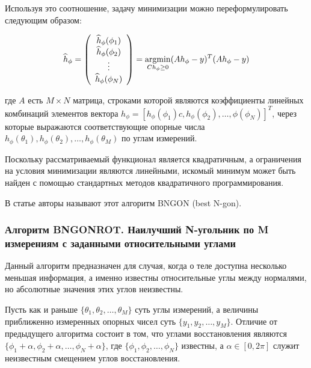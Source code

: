 \documentclass[a4paper, 12pt, titlepage]{article}
\theoremstyle{definition}
\theoremstyle{plain}
\begin{document}
Используя это соотношение, задачу минимизации можно переформулировать следующим
образом:

\begin{equation}
\widehat{h}_{\phi} = \left(
\begin{array}{c}
 \widehat{h}_{\phi}(\phi_{1}) \\
 \widehat{h}_{\phi}(\phi_{2}) \\
 \vdots \\
 \widehat{h}_{\phi}(\phi_{N}) \\
\end{array}
\right) = \operatornamewithlimits{argmin}_{C h_{\phi} \geq 0} (A h_{\phi} -
y)^{T} (A h_{\phi} - y)
\end{equation}

где $A$ есть $M \times N$ матрица, строками которой являются коэффициенты
линейных комбинаций элементов вектора $h_{\phi} = [h_{\phi}(\phi_{1})c,
h_{\phi}(\phi_{2}), \ldots, {\phi}(\phi_{N})]^{T}$, через которые
выражаются соответствующие опорные числа $h_{\phi}(\theta_{1}),
h_{\phi}(\theta_{2}), \ldots, h_{\phi}(\theta_{M})$ по углам измерений.

Поскольку рассматриваемый функционал является квадратичным, а ограничения на
условия минимизации являются линейными, искомый минимум может быть найден с
помощью стандартных методов квадратичного программирования.

В статье авторы называют этот алгоритм BNGON (best N-gon).

\subsubsection{Алгоритм BNGONROT. Наилучший N-угольник по M измерениям с
заданными относительными углами}
\label{sec:history/LeleKW92/algo-BNGONROT}

Данный алгоритм предназначен для случая, когда о теле доступна несколько
меньшая информация, а именно известны относительные углы между нормалями, но
абсолютные значения этих углов неизвестны.

Пусть как и раньше $\{\theta_{1}, \theta_{2}, \ldots,
\theta_{M}\}$ суть углы измерений, а величины приближенно измеренных опорных
чисел суть $\{y_{1}, y_{2}, \ldots, y_{M}\}$. Отличие от предыдущего алгоритма 
состоит в том, что углами восстановления являются $\{\phi_{1} + \alpha,
\phi_{2} + \alpha, \ldots, \phi_{N} + \alpha\}$, где $\{\phi_{1}, \phi_{2},
\ldots, \phi_{N}\}$ известны, а $\alpha \in [0, 2 \pi]$ служит неизвестным
смещением углов восстановления.
\end{document}
